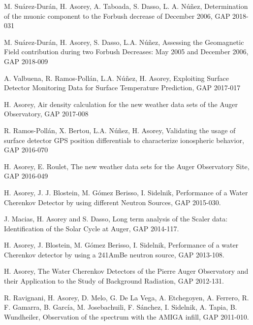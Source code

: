 \noindent
\begin{etaremune}

\item {} M. Suárez-Durán, H. Asorey, A. Taboada, S. Dasso, L. A. Núñez, {{Determination of the muonic component to the Forbush decrease of December 2006}}, GAP 2018-031

\item {} M. Suárez-Durán, H. Asorey, S. Dasso, L.A. Núñez, {{Assessing the Geomagnetic Field contribution during two Forbush Decreases: May 2005 and December 2006}}, GAP 2018-009

\item {} A. Valbuena, R. Ramos-Pollán, L.A. Núñez, H. Asorey, {{Exploiting Surface Detector Monitoring Data for Surface Temperature Prediction}}, GAP 2017-017

\item {} H. Asorey, {{Air density calculation for the new weather data sets of the Auger Observatory}}, GAP 2017-008

\item {} R. Ramos-Pollán, X. Bertou, L.A. Núñez, H. Asorey, {{Validating the usage of surface detector GPS position differentials to characterize ionospheric behavior}}, GAP 2016-070

\item {} H. Asorey, E. Roulet, {{The new weather data sets for the Auger Observatory Site}}, GAP 2016-049

\item {} H. Asorey, J. J. Blostein, M. Gómez Berisso, I. Sidelnik, {{Performance of a Water Cherenkov Detector by using different Neutron Sources}}, GAP 2015-030.

\item {} J. Macias, H. Asorey and S. Dasso, {{Long term analysis of the Scaler data: Identification of the Solar Cycle at Auger}}, GAP 2014-117.

\item {} H. Asorey, J. Blostein, M. Gómez Berisso, I. Sidelnik, {{Performance of a water Cherenkov detector by using a 241AmBe neutron source}}, GAP 2013-108.

\item {} H. Asorey, {{The Water Cherenkov Detectors of the Pierre Auger Observatory and their Application to the Study of Background Radiation}}, GAP 2012-131.

\item {} R. Ravignani, H. Asorey, D. Melo, G. De La Vega, A. Etchegoyen, A. Ferrero, R. F. Gamarra, B. García, M. Josebachuili, F. Sánchez, I. Sidelnik, A. Tapia, B. Wundheiler, {{Observation of the spectrum with the AMIGA infill}}, GAP 2011-010.


\end{etaremune}
